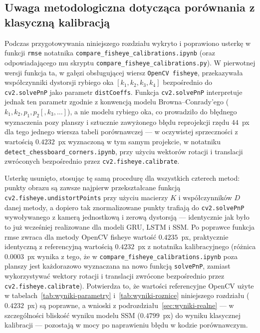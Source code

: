 \subsection{Uwaga metodologiczna dotycząca porównania z klasyczną kalibracją}
\label{sec:uwaga-metodologiczna}

Podczas przygotowywania niniejszego rozdziału wykryto i poprawiono usterkę w
funkcji \texttt{rmse} notatnika \texttt{compare\_fisheye\_calibrations.ipynb}
(oraz odpowiadającego mu skryptu
\texttt{compare\_fisheye\_calibrations.py}). W pierwotnej wersji funkcja ta,
w gałęzi obsługującej wiersz \texttt{OpenCV fisheye}, przekazywała
współczynniki dystorsji rybiego oka $[k_1,k_2,k_3,k_4]$ bezpośrednio do
\texttt{cv2.solvePnP} jako parametr \texttt{distCoeffs}. Funkcja
\texttt{cv2.solvePnP} interpretuje jednak ten parametr zgodnie z konwencją
modelu Browna--Conrady'ego ($k_1,k_2,p_1,p_2[,k_3,\dots]$), a nie modelu
rybiego oka, co prowadziło do błędnego wyznaczenia pozy planszy i sztucznie
zawyżonego błędu reprojekcji rzędu $44$~px dla tego jednego wiersza tabeli
porównawczej --- w oczywistej sprzeczności z wartością $0.4232$~px
wyznaczoną w tym samym projekcie, w notatniku
\texttt{detect\_chessboard\_corners.ipynb}, przy użyciu wektorów rotacji i
translacji zwróconych bezpośrednio przez \texttt{cv2.fisheye.calibrate}.

Usterkę usunięto, stosując tę samą procedurę dla wszystkich czterech metod:
punkty obrazu są zawsze najpierw przekształcane funkcją
\texttt{cv2.fisheye.undistortPoints} przy użyciu macierzy $K$ i
współczynników $D$ danej metody, a dopiero tak znormalizowane punkty trafiają
do \texttt{cv2.solvePnP} wywoływanego z kamerą jednostkową i zerową
dystorsją --- identycznie jak było to już wcześniej realizowane dla modeli
GRU, LSTM i SSM. Po poprawce funkcja rmse zwraca dla metody OpenCV
fisheye wartość $0.4235$~px, praktycznie identyczną z referencyjną wartością
$0.4232$~px z notatnika kalibracyjnego (różnica $0.0003$~px wynika z tego, że
w \texttt{compare\_fisheye\_calibrations.ipynb} poza planszy jest
każdorazowo wyznaczana na nowo funkcją \texttt{solvePnP}, zamiast wykorzystywać
wektory rotacji i translacji zwrócone bezpośrednio przez
\texttt{cv2.fisheye.calibrate}). Potwierdza to, że wartości referencyjne
OpenCV użyte w tabelach~\ref{tab:wyniki-parametry} i~\ref{tab:wyniki-roznice}
niniejszego rozdziału ($0.4232$~px) są poprawne, a wnioski z
podrozdziału~\ref{sec:wyniki-realne} --- w szczególności bliskość wyniku
modelu SSM ($0.4799$~px) do wyniku klasycznej kalibracji --- pozostają w
mocy po naprawieniu błędu w kodzie porównawczym.


